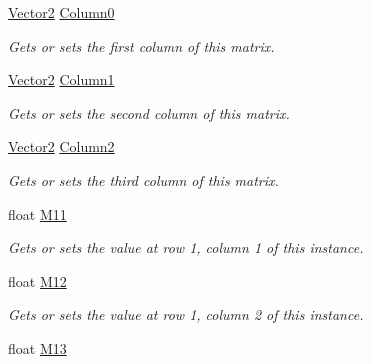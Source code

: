 \begin{DoxyCompactItemize}
\item 
\hyperlink{struct_open_t_k_1_1_vector2}{Vector2} \hyperlink{struct_open_t_k_1_1_matrix2x3_aceafeeb7b09421f748e8f93621f9340d}{Column0}
\begin{DoxyCompactList}\small\item\em Gets or sets the first column of this matrix. \end{DoxyCompactList}\item 
\hyperlink{struct_open_t_k_1_1_vector2}{Vector2} \hyperlink{struct_open_t_k_1_1_matrix2x3_ac60d92ca637f9d483c07f7904a8be81c}{Column1}
\begin{DoxyCompactList}\small\item\em Gets or sets the second column of this matrix. \end{DoxyCompactList}\item 
\hyperlink{struct_open_t_k_1_1_vector2}{Vector2} \hyperlink{struct_open_t_k_1_1_matrix2x3_ac93584e4bf0dc5a1bca1cebea3532870}{Column2}
\begin{DoxyCompactList}\small\item\em Gets or sets the third column of this matrix. \end{DoxyCompactList}\item 
float \hyperlink{struct_open_t_k_1_1_matrix2x3_a7686efba47f2746663c5c285b604ee2a}{M11}
\begin{DoxyCompactList}\small\item\em Gets or sets the value at row 1, column 1 of this instance. \end{DoxyCompactList}\item 
float \hyperlink{struct_open_t_k_1_1_matrix2x3_a9ae398c4140799edc383c67b6e0144be}{M12}
\begin{DoxyCompactList}\small\item\em Gets or sets the value at row 1, column 2 of this instance. \end{DoxyCompactList}\item 
float \hyperlink{struct_open_t_k_1_1_matrix2x3_a113cdc83f86a738e3f0cba0414cfbb9f}{M13}

\end{DoxyCompactItemize}
